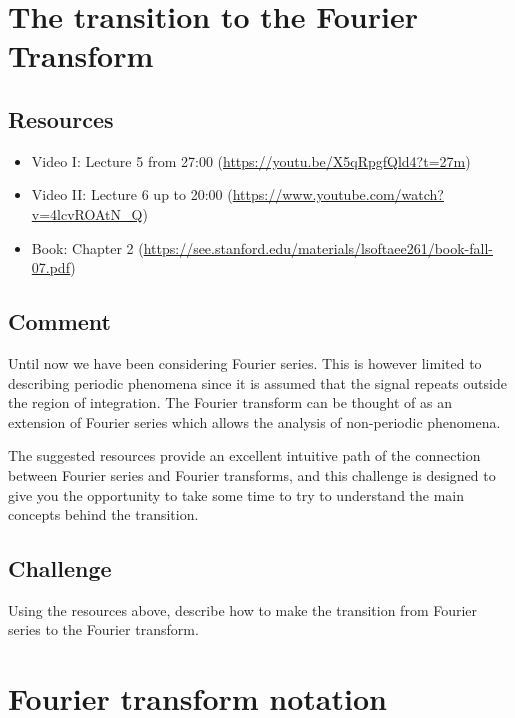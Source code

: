 \newpage
\section{The transition to the Fourier Transform}

\subsection*{Resources}
\begin{itemize}
    \item Video I: Lecture 5 from 27:00 (\url{https://youtu.be/X5qRpgfQld4?t=27m})
    \item Video II: Lecture 6 up to 20:00 (\url{https://www.youtube.com/watch?v=4lcvROAtN_Q})
    \item Book: Chapter 2 (\url{https://see.stanford.edu/materials/lsoftaee261/book-fall-07.pdf})
\end{itemize}

\subsection*{Comment}
Until now we have been considering Fourier series. This is however limited to describing periodic phenomena since it is assumed that the signal repeats outside the region of integration. The Fourier transform can be thought of as an extension of Fourier series which allows the analysis of non-periodic phenomena.

The suggested resources provide an excellent intuitive path of the connection between Fourier series and Fourier transforms, and this challenge is designed to give you the opportunity to take some time to try to understand the main concepts behind the transition.

\subsection*{Challenge}
Using the resources above, describe how to make the transition from Fourier series to the Fourier transform.



\newpage
\section{Fourier transform notation}

